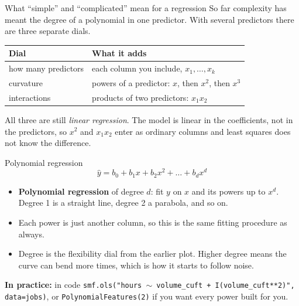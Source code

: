 \documentclass[aspectratio=169]{beamer}
\newenvironment{practice}[1]{\begin{exampleblock}{\textbf{In practice:} #1}}{\end{exampleblock}}
\begin{document}
\begin{frame}{What ``simple'' and ``complicated'' mean for a regression}
So far complexity has meant the degree of a polynomial in one predictor. With several predictors
there are three separate dials.
\begin{center}\small
\begin{tabular}{L{0.26\textwidth} L{0.64\textwidth}}
\toprule
\textbf{Dial} & \textbf{What it adds} \\
\midrule
how many predictors & each column you include, $x_1, \dots, x_k$ \\
curvature & powers of a predictor: $x$, then $x^2$, then $x^3$ \\
interactions & products of two predictors: $x_1 x_2$ \\
\bottomrule
\end{tabular}
\end{center}
\vspace{0.3em}
All three are still \emph{linear regression}. The model is linear in the coefficients, not in the
predictors, so $x^2$ and $x_1x_2$ enter as ordinary columns and least squares does not know the
difference.
\end{frame}

\begin{frame}{Polynomial regression}
\[
  \hat{y} = b_0 + b_1 x + b_2 x^2 + \dots + b_d x^d
\]
\begin{itemize}
  \item \textbf{Polynomial regression} of degree $d$: fit $y$ on $x$ and its powers up to $x^d$.
        Degree 1 is a straight line, degree 2 a parabola, and so on.
  \item Each power is just another column, so this is the same fitting procedure as always.
  \item Degree is the flexibility dial from the earlier plot. Higher degree means the curve can
        bend more times, which is how it starts to follow noise.
\end{itemize}
\begin{practice}{in code}
\texttt{smf.ols("hours $\sim$ volume\_cuft + I(volume\_cuft**2)", data=jobs)}, or
\texttt{PolynomialFeatures(2)} if you want every power built for you.
\end{practice}
\end{frame}
\end{document}
